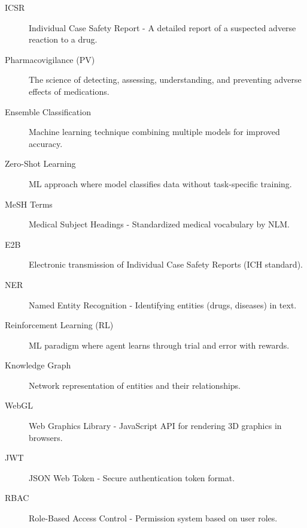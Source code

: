 \begin{description}
    \item[ICSR] Individual Case Safety Report - A detailed report of a suspected adverse reaction to a drug.
    \item[Pharmacovigilance (PV)] The science of detecting, assessing, understanding, and preventing adverse effects of medications.
    \item[Ensemble Classification] Machine learning technique combining multiple models for improved accuracy.
    \item[Zero-Shot Learning] ML approach where model classifies data without task-specific training.
    \item[MeSH Terms] Medical Subject Headings - Standardized medical vocabulary by NLM.
    \item[E2B] Electronic transmission of Individual Case Safety Reports (ICH standard).
    \item[NER] Named Entity Recognition - Identifying entities (drugs, diseases) in text.
    \item[Reinforcement Learning (RL)] ML paradigm where agent learns through trial and error with rewards.
    \item[Knowledge Graph] Network representation of entities and their relationships.
    \item[WebGL] Web Graphics Library - JavaScript API for rendering 3D graphics in browsers.
    \item[JWT] JSON Web Token - Secure authentication token format.
    \item[RBAC] Role-Based Access Control - Permission system based on user roles.
\end{description}



